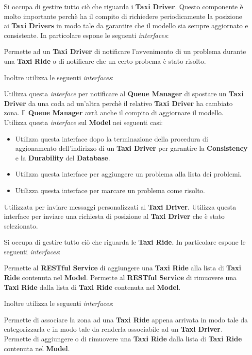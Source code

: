 \begin{itemize}
\begin{itemize}
		 Si occupa di gestire tutto ciò che riguarda i \textbf{Taxi Driver}. 
		Questo componente è molto importante perchè ha il compito di richiedere periodicamente  la posizione ai \textbf{Taxi Drivers} in modo tale da garantire che il modello sia sempre aggiornato e consistente.
		In particolare espone le seguenti \textit{interfaces}:
		\begin{itemize}
			 Permette ad un \textbf{Taxi Driver} di notificare l'avvenimento di un problema durante una \textbf{Taxi Ride} o di notificare che un certo probema è stato risolto.
		\end{itemize}
		Inoltre utilizza le seguenti \textit{interfaces}:
		\begin{itemize}
			 Utilizza questa \textit{interface} per notificare al \textbf{Queue Manager} di spostare un \textbf{Taxi Driver} da una coda ad un'altra perchè il relativo \textbf{Taxi Driver} ha cambiato zona. Il \textbf{Queue Manager} avrà anche il compito di aggiornare il modello.
			 Utilizza questa \textit{interface} sul \textbf{Model} nei seguenti casi: 
			\begin{itemize}
				\item Utilizza questa interface dopo la terminazione della procedura di aggionamento dell'indirizzo di un \textbf{Taxi Driver} per garantire la \textbf{Consistency} e la \textbf{Durability} del \textbf{Database}.
				\item Utilizza questa interface per aggiungere un problema alla lista dei problemi.
				\item Utilizza questa interface per marcare un problema come risolto.
			\end{itemize}
			 Utilizzata per inviare messaggi personalizzati al \textbf{Taxi Driver}.
			 Utilizza questa interface per inviare una richiesta di posizione al \textbf{Taxi Driver} che è stato selezionato.
		\end{itemize}
		
		 Si occupa di gestire tutto ciò che riguarda le \textbf{Taxi Ride}.
		In particolare espone le seguenti \textit{interfaces}:
		\begin{itemize}
			 Permette al \textbf{RESTful Service} di aggiungere una \textbf{Taxi Ride} alla lista di \textbf{Taxi Ride} contenuta nel \textbf{Model}.
			Permette al \textbf{RESTful Service} di rimuovere una \textbf{Taxi Ride} dalla lista di \textbf{Taxi Ride} contenuta nel \textbf{Model}.
		\end{itemize}
		Inoltre utilizza le seguenti \textit{interfaces}:
		\begin{itemize}
			 Permette di associare la zona ad una \textbf{Taxi Ride} appena arrivata in modo tale da categorizzarla e in modo tale da renderla associabile ad un \textbf{Taxi Driver}.
			 Permette di aggiungere o di rimuovere una \textbf{Taxi Ride} dalla lista di \textbf{Taxi Ride} contenuta nel \textbf{Model}.
		\end{itemize} 
		

\end{itemize}
\end{itemize}

